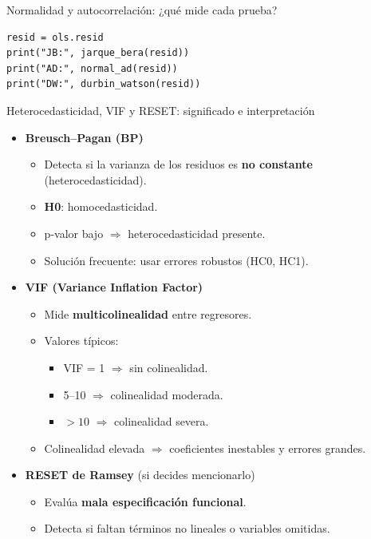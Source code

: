 \documentclass[aspectratio=169,10pt]{beamer}
\begin{document}
\begin{frame}[fragile]{Normalidad y autocorrelación: ¿qué mide cada prueba?}


\begin{lstlisting}
resid = ols.resid
print("JB:", jarque_bera(resid))
print("AD:", normal_ad(resid))
print("DW:", durbin_watson(resid))
\end{lstlisting}

\end{frame}
\begin{frame}[fragile]{Heterocedasticidad, VIF y RESET: significado e interpretación}

\begin{itemize}

  \item \textbf{Breusch–Pagan (BP)}
    \begin{itemize}
      \item Detecta si la varianza de los residuos es \textbf{no constante} (heterocedasticidad).
      \item \textbf{H0}: homocedasticidad.
      \item p-valor bajo $\Rightarrow$ heterocedasticidad presente.
      \item Solución frecuente: usar errores robustos (HC0, HC1).
    \end{itemize}

  \item \textbf{VIF (Variance Inflation Factor)}
    \begin{itemize}
      \item Mide \textbf{multicolinealidad} entre regresores.
      \item Valores típicos:
        \begin{itemize}
          \item VIF = 1 $\Rightarrow$ sin colinealidad.
          \item 5–10 $\Rightarrow$ colinealidad moderada.
          \item $> 10$ $\Rightarrow$ colinealidad severa.
        \end{itemize}
      \item Colinealidad elevada $\Rightarrow$ coeficientes inestables y errores grandes.
    \end{itemize}

  \item \textbf{RESET de Ramsey} (si decides mencionarlo)
    \begin{itemize}
      \item Evalúa \textbf{mala especificación funcional}.
      \item Detecta si faltan términos no lineales o variables omitidas.
    \end{itemize}

\end{itemize}

\end{frame}
\end{document}
